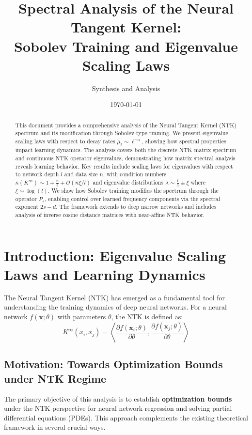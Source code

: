 \documentclass{article}
\title{Spectral Analysis of the Neural Tangent Kernel:\\
Sobolev Training and Eigenvalue Scaling Laws}
\author{Synthesis and Analysis}
\date{\today}
\newcommand{\x}{\mathbf{x}}
\begin{document}
\maketitle

\begin{abstract}
This document provides a comprehensive analysis of the Neural Tangent Kernel (NTK) spectrum and its modification through Sobolev-type training. We present eigenvalue scaling laws with respect to decay rates $\mu_\ell \sim \ell^{-\alpha}$, showing how spectral properties impact learning dynamics. The analysis covers both the discrete NTK matrix spectrum and continuous NTK operator eigenvalues, demonstrating how matrix spectral analysis reveals learning behavior. Key results include scaling laws for eigenvalues with respect to network depth $l$ and data size $n$, with condition numbers $\kappa(K^{\infty}) \sim 1 + \frac{n}{3} + \mathcal{O}(n \xi / l)$ and eigenvalue distributions $\lambda \sim \frac{l}{4} \pm \xi$ where $\xi \sim \log(l)$. We show how Sobolev training modifies the spectrum through the operator $P_s$, enabling control over learned frequency components via the spectral exponent $2s-d$. The framework extends to deep narrow networks and includes analysis of inverse cosine distance matrices with near-affine NTK behavior.
\end{abstract}

\tableofcontents
\newpage

\section{Introduction: Eigenvalue Scaling Laws and Learning Dynamics}

The Neural Tangent Kernel (NTK) has emerged as a fundamental tool for understanding the training dynamics of deep neural networks. For a neural network $f(\x; \theta)$ with parameters $\theta$, the NTK is defined as:
$$K^{\infty}(x_i, x_j) = \left\langle \frac{\partial f(\x_i; \theta)}{\partial \theta}, \frac{\partial f(\x_j; \theta)}{\partial \theta} \right\rangle$$

\subsection{Motivation: Towards Optimization Bounds under NTK Regime}

The primary objective of this analysis is to establish \textbf{optimization bounds} under the NTK perspective for neural network regression and solving partial differential equations (PDEs). This approach complements the existing theoretical framework in several crucial ways.
\end{document}

